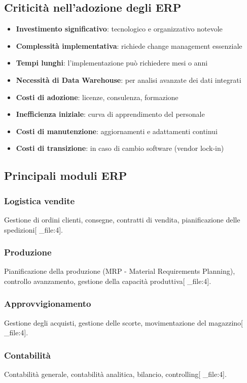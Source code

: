 \documentclass[12pt,a4paper]{article}
\begin{document}
\subsection{Criticità nell'adozione degli ERP}
\begin{itemize}
    \item \textbf{Investimento significativo}: tecnologico e organizzativo notevole
    \item \textbf{Complessità implementativa}: richiede change management essenziale
    \item \textbf{Tempi lunghi}: l'implementazione può richiedere mesi o anni
    \item \textbf{Necessità di Data Warehouse}: per analisi avanzate dei dati integrati
    \item \textbf{Costi di adozione}: licenze, consulenza, formazione
    \item \textbf{Inefficienza iniziale}: curva di apprendimento del personale
    \item \textbf{Costi di manutenzione}: aggiornamenti e adattamenti continui
    \item \textbf{Costi di transizione}: in caso di cambio software (vendor lock-in)
\end{itemize}

\subsection{Principali moduli ERP}

\subsubsection{Logistica vendite}
Gestione di ordini clienti, consegne, contratti di vendita, pianificazione delle spedizioni[ _file:4].

\subsubsection{Produzione}
Pianificazione della produzione (MRP - Material Requirements Planning), controllo avanzamento, gestione della capacità produttiva[ _file:4].

\subsubsection{Approvvigionamento}
Gestione degli acquisti, gestione delle scorte, movimentazione del magazzino[ _file:4].

\subsubsection{Contabilità}
Contabilità generale, contabilità analitica, bilancio, controlling[ _file:4].
\end{document}
